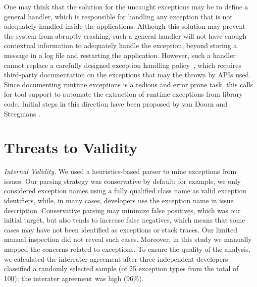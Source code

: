One may think that the solution for the uncaught exceptions may be to define a general handler, 
which is responsible for handling any exception that is not
adequately handled inside the applications. Although this 
solution may prevent  the system from abruptly crashing,
 such a general handler will not have enough
contextual information to adequately handle the exception, 
beyond storing a message in a log file and restarting the application.
However, such a handler cannot replace a carefully designed exception 
handling policy~\cite{Robil00}, which requires
third-party documentation on the exceptions that
may the thrown by APIs used. 
Since  documenting runtime exceptions is a tedious and error prone
task, 
this calls for tool support to automate the extraction of runtime exceptions
from library code. Initial steps in this direction have been proposed
by van Doorn and Steegmans \cite{van2005combining}.



\section{Threats to Validity}
\label{sec:threats}

\emph{Internal Validity.} We used a heuristics-based parser to mine
exceptions from issues.  Our parsing strategy was conservative by default; for
example, we only considered exception names using a fully qualified class name
as valid exception identifiers, while, in many cases, developers use the
exception name in issue description. Conservative parsing may minimize false
positives, which was our initial target, but also tends to increase false
negatives, which means that some cases may have not been identified as
exceptions or stack traces. Our limited manual inspection did not reveal such
cases. Moreover, in this study we manually mapped the concerns related
to exceptions. To ensure the quality of the analysis, we calculated the
 interrater agreement after three independent 
developers classified a randomly selected sample (of 25 exception 
types from the total of 100); the interater agreement was high (96\%). 

